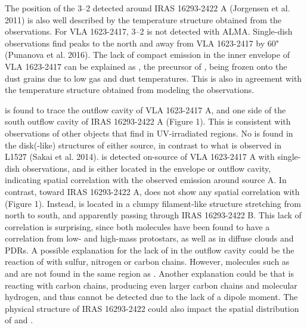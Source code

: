 \documentclass{iaus}
\begin{document}
The position of the  3--2 detected around IRAS 16293-2422 A (Jorgensen et al. 2011) is also well described by the temperature structure obtained from the  observations.
For VLA 1623-2417,  3--2 is not detected with ALMA. 
Single-dish observations find  peaks to the north and away from VLA 1623-2417 by 60" (Punanova et al. 2016).
The lack of compact  emission in the inner envelope of VLA 1623-2417 can be explained as , the precursor of , being frozen onto the dust grains due to low gas and dust temperatures.
This is also in agreement with the temperature structure obtained from modeling the  observations.

 is found to trace the outflow cavity of VLA 1623-2417 A, and one side of the south outflow cavity of IRAS 16293-2422 A (Figure 1).
This is consistent with observations of other objects that find  in UV-irradiated regions.
No  is found in the disk(-like) structures of either source, in contrast to what is observed in L1527 (Sakai et al. 2014).
 is detected on-source of VLA 1623-2417 A with single-dish observations, and is either located in the envelope or outflow cavity, indicating spatial correlation with the observed  emission around source A.
In contrast, toward IRAS 16293-2422 A,  does not show any spatial correlation with  (Figure 1).
Instead,  is located in a clumpy filament-like structure stretching from north to south, and apparently passing through IRAS 16293-2422 B.
This lack of correlation is surprising, since both molecules have been found to have a correlation from low- and high-mass protostars, as well as in diffuse clouds and PDRs.
A possible explanation for the lack of  in the outflow cavity could be the reaction of  with sulfur, nitrogen or carbon chains. 
However, molecules such as  and  are not found in the same region as . 
Another explanation could be that  is reacting with carbon chains, producing even larger carbon chains and molecular hydrogen, and thus cannot be detected due to the lack of a dipole moment.
The physical structure of IRAS 16293-2422 could also impact the spatial distribution of  and .
\end{document}
